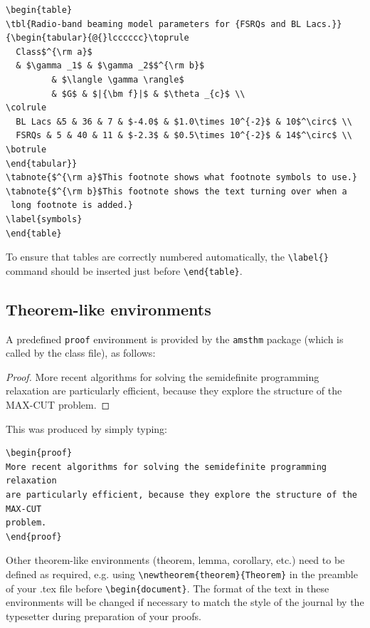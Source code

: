 \documentclass{tADR2e}
\begin{document}
\begin{verbatim}
\begin{table}
\tbl{Radio-band beaming model parameters for {FSRQs and BL Lacs.}}
{\begin{tabular}{@{}lcccccc}\toprule
  Class$^{\rm a}$
  & $\gamma _1$ & $\gamma _2$$^{\rm b}$
         & $\langle \gamma \rangle$
         & $G$ & $|{\bm f}|$ & $\theta _{c}$ \\
\colrule
  BL Lacs &5 & 36 & 7 & $-4.0$ & $1.0\times 10^{-2}$ & 10$^\circ$ \\
  FSRQs & 5 & 40 & 11 & $-2.3$ & $0.5\times 10^{-2}$ & 14$^\circ$ \\
\botrule
\end{tabular}}
\tabnote{$^{\rm a}$This footnote shows what footnote symbols to use.}
\tabnote{$^{\rm b}$This footnote shows the text turning over when a 
 long footnote is added.}
\label{symbols}
\end{table}
\end{verbatim}

To ensure that tables are correctly numbered automatically, the
\verb"\label{}" command should be inserted just before
\verb"\end{table}".


\subsection{Theorem-like environments}

A predefined \verb"proof" environment is provided by the {\tt amsthm} package (which is called by the class file), as follows:

\begin{proof}
More recent algorithms for solving the semidefinite programming relaxation are
particularly efficient, because they explore the structure of the MAX-CUT problem.
\end{proof}
\noindent This was produced by simply typing:
%
\begin{verbatim}
\begin{proof}
More recent algorithms for solving the semidefinite programming relaxation
are particularly efficient, because they explore the structure of the MAX-CUT
problem.
\end{proof}
\end{verbatim}
%
Other theorem-like environments (theorem, lemma, corollary, etc.) need to be defined as required, e.g. using
\verb"\newtheorem{theorem}{Theorem}" in the preamble of your .tex file before \verb"\begin{document}". The
format of the text in these environments will be changed if necessary to match the style of the journal by the
typesetter during preparation of your proofs.
\end{document}
